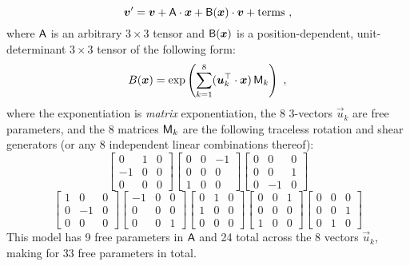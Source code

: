 \documentclass[modern]{aastex62}
\begin{document}
\begin{equation}
  \vec{v}' = \vec{v} + \mat{A}\cdot\vec{x} + \mat{B}(\vec{x})\cdot\vec{v} + \mbox{terms}
  ~,
\end{equation}
where
$\mathsf{A}$ is an arbitrary $3\times 3$ tensor and
$\mathsf{B}(\boldsymbol{x})$ is a position-dependent, unit-determinant $3\times 3$ tensor
of the following form:
\begin{equation}
  B(\vec{x}) = \exp\left(\sum_{k=1}^8 (\vec{u}_k^\top\cdot\vec{x})\,\mat{M}_k\right)
  ~,
\end{equation}
where
the exponentiation is \emph{matrix} exponentiation,
the 8 3-vectors $\vec{u}_k$ are free parameters,
and the 8 matrices $\mathsf{M}_k$ are the following traceless rotation and shear generators (or any 8 independent linear combinations thereof):
\begin{equation}
  \begin{bmatrix} 0 & 1 & 0 \\ -1 & 0 & 0 \\ 0 & 0 & 0 \end{bmatrix}
  \begin{bmatrix} 0 & 0 & -1 \\ 0 & 0 & 0 \\ 1 & 0 & 0 \end{bmatrix}
  \begin{bmatrix} 0 & 0 & 0 \\ 0 & 0 & 1 \\ 0 & -1 & 0 \end{bmatrix}
\end{equation}
\begin{equation}
  \begin{bmatrix} 1 & 0 & 0 \\ 0 & -1 & 0 \\ 0 & 0 & 0 \end{bmatrix}
  \begin{bmatrix} -1 & 0 & 0 \\ 0 & 0 & 0 \\ 0 & 0 & 1 \end{bmatrix}
  \begin{bmatrix} 0 & 1 & 0 \\ 1 & 0 & 0 \\ 0 & 0 & 0 \end{bmatrix}
  \begin{bmatrix} 0 & 0 & 1 \\ 0 & 0 & 0 \\ 1 & 0 & 0 \end{bmatrix}
  \begin{bmatrix} 0 & 0 & 0 \\ 0 & 0 & 1 \\ 0 & 1 & 0 \end{bmatrix}
\end{equation}
This model has 9 free parameters in $\mathsf{A}$ and 24 total across
the 8 vectors $\vec{u}_k$, making for 33 free parameters in total.
\end{document}
